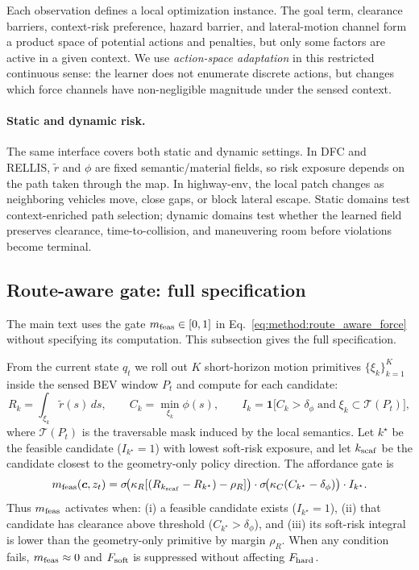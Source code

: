 Each observation defines a local optimization instance.
The goal term, clearance barriers, context-risk preference, hazard
barrier, and lateral-motion channel form a product space of potential
actions and penalties, but only some factors are active in a given
context.
We use \emph{action-space adaptation} in this restricted continuous
sense: the learner does not enumerate discrete actions, but changes which
force channels have non-negligible magnitude under the sensed context.

\paragraph{Static and dynamic risk.}
The same interface covers both static and dynamic settings.
In DFC and RELLIS, $\tilde r$ and $\phi$ are fixed semantic/material
fields, so risk exposure depends on the path taken through the map.
In highway-env, the local patch changes as neighboring vehicles move,
close gaps, or block lateral escape.
Static domains test context-enriched path selection; dynamic domains test
whether the learned field preserves clearance, time-to-collision, and
maneuvering room before violations become terminal.

\subsection{Route-aware gate: full specification}
\label{app:gate}

The main text uses the gate $m_{\rm feas}\in[0,1]$ in
Eq.~\eqref{eq:method:route_aware_force} without specifying its computation.
This subsection gives the full specification.

From the current state $q_t$ we roll out $K$ short-horizon motion
primitives $\{\xi_k\}_{k=1}^K$ inside the sensed BEV window $P_t$ and
compute for each candidate:
\begin{equation}
R_k = \int_{\xi_k}\tilde r(s)\,ds,
\qquad
C_k = \min_{\xi_k}\phi(s),
\qquad
I_k = \mathbf{1}\bigl[C_k>\delta_\phi
      \;\text{and}\;\xi_k\subset\mathcal{T}(P_t)\bigr],
\label{eq:gate_primitives}
\end{equation}
where $\mathcal{T}(P_t)$ is the traversable mask induced by the local
semantics.
Let $k^\star$ be the feasible candidate ($I_{k^\star}=1$) with lowest
soft-risk exposure, and let $k_{\rm scaf}$ be the candidate closest to
the geometry-only policy direction.
The affordance gate is
\begin{equation}
m_{\rm feas}(\vec c,z_t)
=
\sigma\!\bigl(\kappa_R[(R_{k_{\rm scaf}}-R_{k^\star})-\rho_R]\bigr)
\cdot
\sigma\!\bigl(\kappa_C(C_{k^\star}-\delta_\phi)\bigr)
\cdot
I_{k^\star}.
\label{eq:gate_full}
\end{equation}
Thus $m_{\rm feas}$ activates when: (i) a feasible candidate exists
($I_{k^\star}=1$), (ii) that candidate has clearance above threshold
($C_{k^\star}>\delta_\phi$), and (iii) its soft-risk integral is lower
than the geometry-only primitive by margin $\rho_R$.
When any condition fails, $m_{\rm feas}\approx0$ and $F_{\rm soft}$ is
suppressed without affecting $F_{\rm hard}$.

